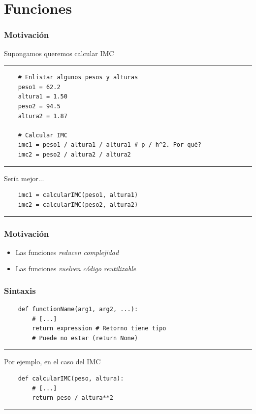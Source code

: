 \documentclass[14pt,aspectratio=169,xcolor=dvipsnames]{beamer}
\begin{document}
\section{Funciones}
\begin{frame}[fragile]\frametitle{Motivación}
Supongamos queremos calcular IMC

\rule{\textwidth}{1pt}
\scriptsize
\begin{verbatim}
    # Enlistar algunos pesos y alturas
    peso1 = 62.2
    altura1 = 1.50
    peso2 = 94.5
    altura2 = 1.87
    
    # Calcular IMC
    imc1 = peso1 / altura1 / altura1 # p / h^2. Por qué?
    imc2 = peso2 / altura2 / altura2
\end{verbatim}
\rule{\textwidth}{1pt}
\pause Sería mejor... 
\begin{verbatim}
    imc1 = calcularIMC(peso1, altura1)
    imc2 = calcularIMC(peso2, altura2)
\end{verbatim}
\rule{\textwidth}{1pt}

\end{frame}
\begin{frame}\frametitle{Motivación}
    \begin{itemize}
        \item Las funciones \emph{reducen complejidad}
        \item Las funciones \emph{vuelven código reutilizable}
    \end{itemize}
\end{frame}
\begin{frame}[fragile]\frametitle{Sintaxis}

\begin{verbatim}
    def functionName(arg1, arg2, ...):
        # [...]
        return expression # Retorno tiene tipo 
        # Puede no estar (return None)
\end{verbatim}
\rule{\textwidth}{1pt}
Por ejemplo, en el caso del IMC
\begin{verbatim}
    def calcularIMC(peso, altura):
        # [...]
        return peso / altura**2
\end{verbatim}
\rule{\textwidth}{1pt}
\end{frame}
\end{document}
